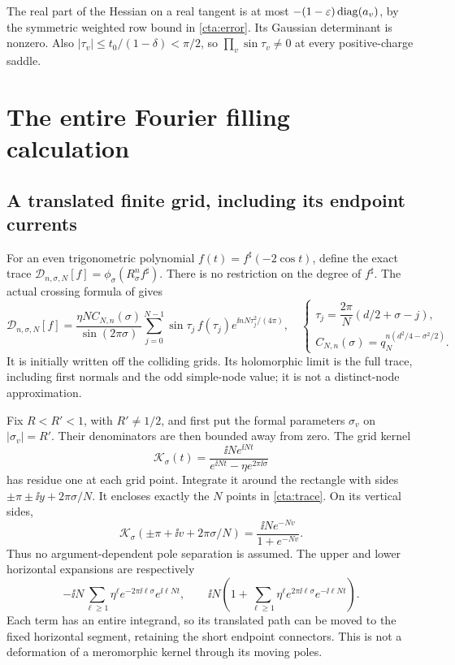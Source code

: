 The real part of the Hessian on a real tangent is at most
\(-(1-\varepsilon)\operatorname{diag}(a_v)\), by the symmetric weighted
row bound in \eqref{cta:error}. Its Gaussian determinant
is nonzero. Also
\(|\tau_v|\le t_0/(1-\delta)<\pi/2\), so
\(\prod_v\sin\tau_v\ne0\) at every positive-charge saddle.

\section{The entire Fourier filling calculation}\label{cta:Fourier}

\subsection{A translated finite grid, including its endpoint currents}
For an even trigonometric polynomial
\(f(t)=f^\sharp(-2\cos t)\), define the exact trace
\(\mathcal D_{n,\sigma,N}[f]=\phi_\sigma(R_\sigma^n f^\sharp)\).
There is no restriction on the degree of \(f^\sharp\).
The actual crossing formula of
\cite[Proposition~6.1 and equation~(6.4)]{Meridian} gives
\begin{equation}\label{cta:trace}
 \mathcal D_{n,\sigma,N}[f]
 =\frac{\eta N C_{N,n}(\sigma)}{\sin(2\pi\sigma)}
   \sum_{j=0}^{N-1}
     \sin\tau_j\, f(\tau_j)e^{\ii nN\tau_j^2/(4\pi)},
 \quad
 \begin{cases}
 \tau_j=\dfrac{2\pi}{N}(d/2+\sigma-j),\\
 C_{N,n}(\sigma)=q_N^{n(d^2/4-\sigma^2/2)} .
 \end{cases}
\end{equation}
It is initially written off the colliding grids. Its holomorphic
limit is the full trace, including first normals and the odd
simple-node value; it is not a distinct-node approximation.

Fix \(R<R'<1\), with \(R'\ne1/2\), and first put the formal
parameters \(\sigma_v\) on \(|\sigma_v|=R'\).
Their denominators are then bounded away from zero.
The grid kernel
\[
 \mathcal K_\sigma(t)=
 \frac{\ii N e^{\ii Nt}}{e^{\ii Nt}-\eta e^{2\pi\ii\sigma}}
\]
has residue one at each grid point. Integrate it around the
rectangle with sides \(\pm\pi\pm\ii y+2\pi\sigma/N\).
It encloses exactly the \(N\) points in \eqref{cta:trace}.
On its vertical sides,
\[
 \mathcal K_\sigma(\pm\pi+\ii v+2\pi\sigma/N)
           =\frac{\ii N e^{-Nv}}{1+e^{-Nv}}.
\]
Thus no argument-dependent pole separation is assumed.
The upper and lower horizontal expansions are respectively
\[
 -\ii N\sum_{\ell\ge1}
     \eta^\ell e^{-2\pi\ii\ell\sigma}e^{\ii\ell Nt},
 \qquad
 \ii N\left(1+\sum_{\ell\ge1}
     \eta^\ell e^{2\pi\ii\ell\sigma}e^{-\ii\ell Nt}\right).
\]
Each term has an entire integrand, so its translated path can
be moved to the fixed horizontal segment, retaining the short
endpoint connectors. This is not a deformation of a meromorphic
kernel through its moving poles.

